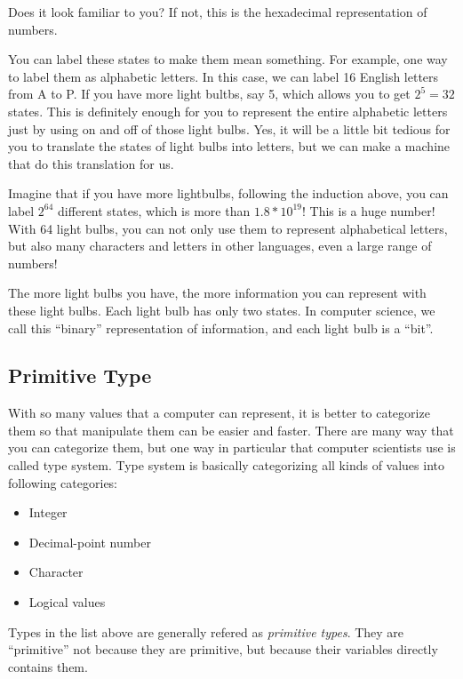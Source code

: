 \documentclass[../main.tex]{subfiles}
\begin{document}
Does it look familiar to you? If not, this is the hexadecimal representation of
numbers.

You can label these states to make them mean something. For example, one way to
label them as alphabetic letters. In this case, we can label 16 English letters
from A to P. If you have more light bultbs, say 5, which allows you to get \(2^5 = 32\)
states. This is definitely enough for you to represent the entire alphabetic
letters just by using on and off of those light bulbs. Yes, it will be a little
bit tedious for you to translate the states of light bulbs into letters, but we
can make a machine that do this translation for us.

Imagine that if you have more lightbulbs, following the induction above, you can
label \(2^64\) different states, which is more than \(1.8 * 10^19\)! This is a huge
number! With 64 light bulbs, you can not only use them to represent alphabetical
letters, but also many characters and letters in other languages, even a large
range of numbers!

The more light bulbs you have, the more information you can represent with these
light bulbs. Each light bulb has only two states. In computer science, we call
this ``binary'' representation of information, and each light bulb is a ``bit''.


\subsection{Primitive Type}
With so many values that a computer can represent, it is better to categorize
them so that manipulate them can be easier and faster. There are many way that
you can categorize them, but one way in particular that computer scientists use
is called type system. Type system is basically categorizing all kinds of values
into following categories:

\begin{itemize}
    \item Integer
    \item Decimal-point number
    \item Character
    \item Logical values
\end{itemize}

Types in the list above are generally refered as \emph{primitive types}. They
are ``primitive'' not because they are primitive, but because their variables
directly contains them.
\end{document}
